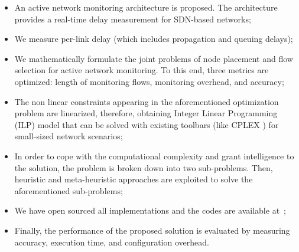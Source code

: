 \documentclass[10pt, journal, letterpaper]{IEEEtran}
\begin{document}
\begin{itemize}
    \item An active network monitoring architecture is proposed. The architecture provides a real-time delay measurement for SDN-based networks;
    \item  We measure per-link delay (which includes propagation and queuing delays);
    \item We mathematically formulate the joint problems of node placement and flow selection for active network monitoring. To this end, three metrics are optimized: length of monitoring flows, monitoring overhead, and accuracy;
    \item The non linear constraints appearing in the aforementioned optimization problem are linearized, therefore, obtaining Integer Linear Programming (ILP) model that can be solved with existing toolbars (like CPLEX \cite{cplex2009v12}) for small-sized network scenarios;
    \item In order to cope with the computational complexity and grant intelligence to the solution, the problem is broken down into two sub-problems. Then, heuristic and meta-heuristic approaches are exploited to solve the aforementioned sub-problems;
    \item We have open sourced all implementations and the codes are available at~\cite{monitoringCodeOurImplementation};
    \item Finally, the performance of the proposed solution is evaluated by measuring accuracy, execution time, and configuration overhead.
\end{itemize}



\end{document}
